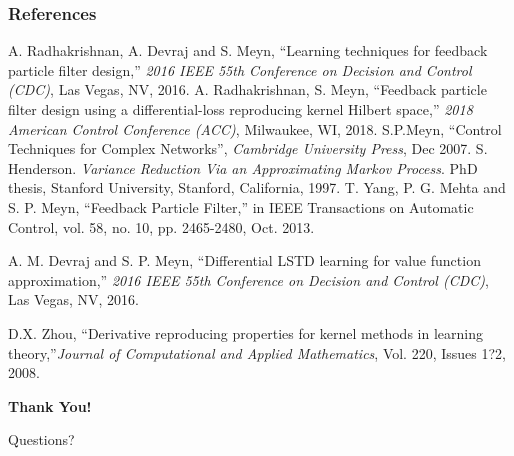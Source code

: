 \documentclass[xcolor=dvipsnames, subsection=false]{beamer}
\def\alertb#1{\alert{\color{BrickRed}  #1}}
\def\alertb#1{\alert{\color{BrickRed}  #1}}
\begin{document}
%	
%	
%	

\begin{frame}
\frametitle{References}

\begin{thebibliography}{10}
	\tiny
	A. Radhakrishnan, A. Devraj and S. Meyn, ``Learning techniques for feedback particle filter design,'' \textit{ 2016 IEEE 55th Conference on Decision and Control (CDC)}, Las Vegas, NV, 2016.
	A. Radhakrishnan, S. Meyn, ``Feedback particle filter design using a differential-loss reproducing kernel Hilbert space,'' \textit{2018 American Control Conference (ACC)}, Milwaukee, WI, 2018.
	S.P.Meyn, ``Control Techniques for Complex Networks'', \textit{Cambridge University Press}, Dec 2007.
	S. Henderson. \textit{Variance Reduction Via an Approximating Markov Process}. PhD thesis, Stanford University, Stanford, California, 1997.
	T. Yang, P. G. Mehta and S. P. Meyn, ``Feedback Particle Filter,'' in IEEE Transactions on Automatic Control, vol. 58, no. 10, pp. 2465-2480, Oct. 2013.
	
	A. M. Devraj and S. P. Meyn, ``Differential LSTD learning for value function approximation,'' \textit{2016 IEEE 55th Conference on Decision and Control (CDC)}, Las Vegas, NV, 2016.
	
	D.X. Zhou,
``Derivative reproducing properties for kernel methods in learning theory,''\textit{Journal of Computational and Applied Mathematics},
 Vol. 220, Issues 1?2,
	2008.
	
\end{thebibliography}
\end{frame}



\begin{frame}
\centerline{\bf \huge \color{OrangeRed} Thank You!}
\vfill
\centerline{\huge \alertb{Questions?}}
\vfill
\end{frame}
\end{document}
